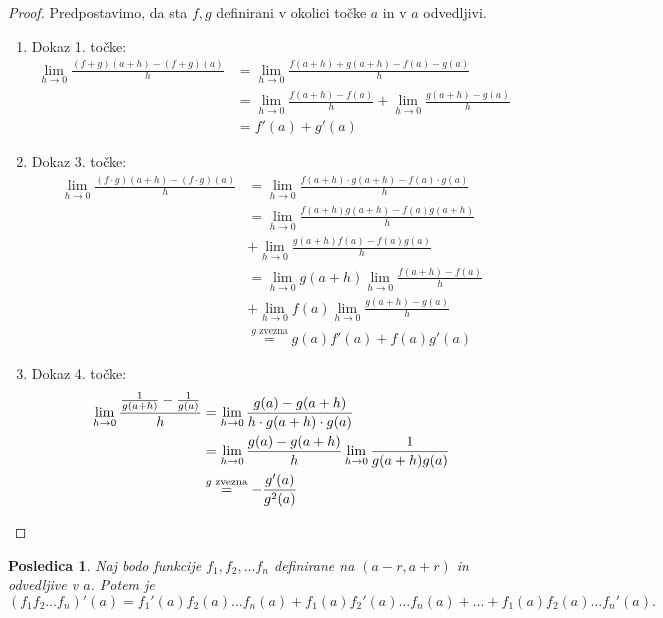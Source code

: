 \documentclass[10pt, a4paper]{article}
\newtheorem{posledica}[izr]{Posledica}
\newenvironment{noticeC}{%
  \tcolorbox[%
  notitle,
  empty,
  enhanced,  %
  breakable,
  coltext=black, 
  fontupper=\rmfamily,
  parbox=false,
  noparskip,
  sharp corners,
  boxrule=-1pt,  %
  frame hidden,
  left=7pt,  %
  right=7pt,
  top=5pt,
  bottom=5pt,
  before skip=2.5ex plus 2pt,
  after skip=2.5ex plus 2pt,
  overlay unbroken and last={%
  },
  ]}
{\endtcolorbox}
\newenvironment{dokaz}%
  {\begin{noticeC}\begin{proof}}%
  {\end{proof}\end{noticeC}}
\newcommand{\limf}[3]{\lim_{#1 \to #2} {#3}}
\begin{document}
\begin{dokaz}
    Predpostavimo, da sta $f,g$ definirani v okolici točke $a$ in v $a$ odvedljivi.
    \begin{enumerate}
        \item Dokaz 1. točke:
        \begin{align*}
            \limf{h}{0}{\frac{(f+g)(a+h) - (f+g)(a)}{h}} &= \limf{h}{0}{\frac{f(a+h) + g(a+h) - f(a) - g(a)}{h}}\\
            &= \limf{h}{0}{\frac{f(a+h) - f(a)}{h}} + \limf{h}{0}{\frac{g(a+h) - g(a)}{h}}\\
            &= f'(a) + g'(a)
        \end{align*}
        \item Dokaz 3. točke:
        \begin{align*}
            \limf{h}{0}{\frac{(f\cdot  g)(a+h) - (f \cdot g)(a)}{h}} &= \limf{h}{0}{\frac{f(a+h) \cdot g(a+h) - f(a) \cdot g(a)}{h}}\\
            &= \limf{h}{0}{\frac{f(a+h) g(a+h) - f(a) g(a+h)}{h}}\\ &+ \limf{h}{0}{\frac{g(a+h) f(a) - f(a) g(a)}{h}}\\
            &= \limf{h}{0}{g(a+h)} \limf{h}{0}{\frac{f(a+h) - f(a)}{h}}\\ &+ \limf{h}{0}{f(a)}\limf{h}{0}{\frac{g(a+h) - g(a)}{h}}\\
            &\stackrel{\text{$g$ zvezna}}{=} g(a) f'(a) + f(a) g'(a)
        \end{align*}
        \item Dokaz 4. točke:
        \begin{align*}
            \limf{h}{0}{\frac{\frac{1}{g(a+h)} - \frac{1}{g(a)}}{h}} &= \limf{h}{0}{\frac{g(a) - g(a+h)}{h \cdot g(a+h) \cdot g(a)}}\\
            &= \limf{h}{0}{\frac{g(a) - g(a+h)}{h}} \limf{h}{0}{\frac{1}{g(a+h)g(a)}}\\
            &\stackrel{\text{$g$ zvezna}}{=} -\frac{g'(a)}{g^2(a)} \qedhere
        \end{align*}
    \end{enumerate}
\end{dokaz}

\begin{posledica}
    Naj bodo funkcije $f_1, f_2, \dots f_n$ definirane na $(a-r, a+r)$ in odvedljive v $a$. Potem je
    $$(f_1 f_2 \dots f_n)'(a) = f_1'(a) f_2(a) \dots f_n(a) + f_1 (a) f_2'(a) \dots f_n(a) + \dots + f_1(a) f_2(a) \dots f_n'(a).$$
\end{posledica}
\end{document}
